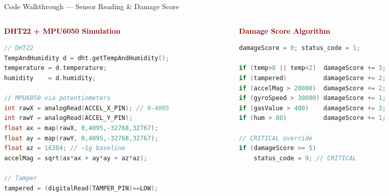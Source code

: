 \documentclass[aspectratio=169, 10pt]{beamer}
\begin{document}
\begin{frame}[fragile,shrink=3]{Code Walkthrough --- Sensor Reading \& Damage Score}
  \begin{columns}[T]
    \begin{column}{0.5\textwidth}
      \textbf{\textcolor{darkred}{DHT22 + MPU6050 Simulation}}
      \begin{lstlisting}[language=C++]
// DHT22
TempAndHumidity d = dht.getTempAndHumidity();
temperature = d.temperature;
humidity    = d.humidity;

// MPU6050 via potentiometers
int rawX = analogRead(ACCEL_X_PIN); // 0-4095
int rawY = analogRead(ACCEL_Y_PIN);
float ax = map(rawX, 0,4095,-32768,32767);
float ay = map(rawY, 0,4095,-32768,32767);
float az = 16384; // ~1g baseline
accelMag = sqrt(ax*ax + ay*ay + az*az);

// Tamper
tampered = (digitalRead(TAMPER_PIN)==LOW);
      \end{lstlisting}
    \end{column}
    \begin{column}{0.5\textwidth}
      \textbf{\textcolor{darkred}{Damage Score Algorithm}}
      \begin{lstlisting}[language=C++]
damageScore = 0; status_code = 1;

if (temp>8 || temp<2)  damageScore += 3;
if (tampered)          damageScore += 2;
if (accelMag > 20000)  damageScore += 2;
if (gyroSpeed > 30000) damageScore += 1;
if (gasValue > 400)    damageScore += 3;
if (hum > 80)          damageScore += 1;

// CRITICAL override
if (damageScore >= 5)
    status_code = 9; // CRITICAL
      \end{lstlisting}
    \end{column}
  \end{columns}
\end{frame}
\end{document}
